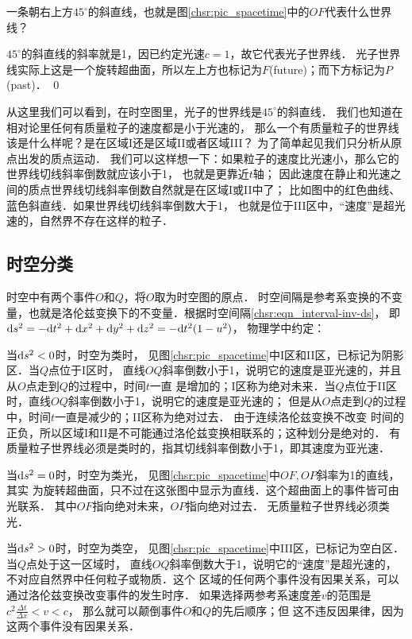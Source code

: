 \begin{example}
一条朝右上方$45^{\circ}$的斜直线，也就是图\ref{chsr:pic_spacetime}中的$OF$代表什么世界线？
\end{example}
$45^{\circ}$的斜直线的斜率就是1，因已约定光速$c=1$，故它代表光子世界线．
光子世界线实际上这是一个旋转超曲面，所以左上方也标记为$F$(future)；而下方标记为$P$(past)．
\qed

从这里我们可以看到，在时空图里，光子的世界线是$45^{\circ}$的斜直线．
我们也知道在相对论里任何有质量粒子的速度都是小于光速的，
那么一个有质量粒子的世界线该是什么样呢？是在区域I还是区域II或者区域III？
为了简单起见我们只分析从原点出发的质点运动．
我们可以这样想一下：如果粒子的速度比光速小，那么它的世界线切线斜率倒数就应该小于1，
也就是更靠近$t$轴；
因此速度在静止和光速之间的质点世界线切线斜率倒数自然就是在区域I或II中了；
比如图中的红色曲线、蓝色斜直线．如果世界线切线斜率倒数大于1，
也就是位于III区中，“速度”是超光速的，自然界不存在这样的粒子．


\subsection{时空分类}\label{chsr:sec_stc}
时空中有两个事件$O$和$Q$，将$O$取为时空图的原点．
时空间隔是参考系变换的不变量，也就是洛伦兹变换下的不变量．根据时空间隔\eqref{chsr:eqn_interval-inv-ds}，
即${\rm d}s^2 = -{\rm d}t^2 +{\rm d}x^2 +{\rm d}y^2 +{\rm d}z^2 =-{\rm d}t^2 (1-u^2)$，
物理学中约定：

\noindent{} 当${\rm d}s^2 <0 $时，时空为{\heiti 类时}，
见图\ref{chsr:pic_spacetime}中I区和II区，已标记为阴影区．当$Q$点位于I区时，
直线$OQ$斜率倒数小于1，说明它的速度是亚光速的，并且从$O$点走到$Q$的过程中，时间$t$一直
是增加的；I区称为绝对未来．当$Q$点位于II区时，直线$OQ$斜率倒数小于1，说明它的速度是亚光速的；
但是从$O$点走到$Q$的过程中，时间$t$一直是减少的；II区称为绝对过去．
由于连续洛伦兹变换不改变
时间的正负，所以区域I和II是不可能通过洛伦兹变换相联系的；这种划分是绝对的．
有质量粒子世界线必须是类时的，指其切线斜率倒数小于1，即其速度为亚光速．


\noindent{} 当${\rm d}s^2 =0 $时，时空为{\heiti 类光}，
见图\ref{chsr:pic_spacetime}中$OF,OP$斜率为1的直线，其实
为旋转超曲面，只不过在这张图中显示为直线．这个超曲面上的事件皆可由光联系．
其中$OF$指向绝对未来，$OP$指向绝对过去．
无质量粒子世界线必须类光．

\noindent{} 当${\rm d}s^2 >0 $时，时空为{\heiti 类空}，
见图\ref{chsr:pic_spacetime}中III区，已标记为空白区．当$Q$点处于这一区域时，
直线$OQ$斜率倒数大于1，说明它的“速度”是超光速的，不对应自然界中任何粒子或物质．这个
区域的任何两个事件没有因果关系，可以通过洛伦兹变换改变事件的发生时序．
如果选择两参考系速度差$v$的范围是$c^2\frac{\Delta t}{\Delta x}<v<c$，
那么就可以颠倒事件$O$和$Q$的先后顺序；但
这不违反因果律，因为这两个事件没有因果关系．

